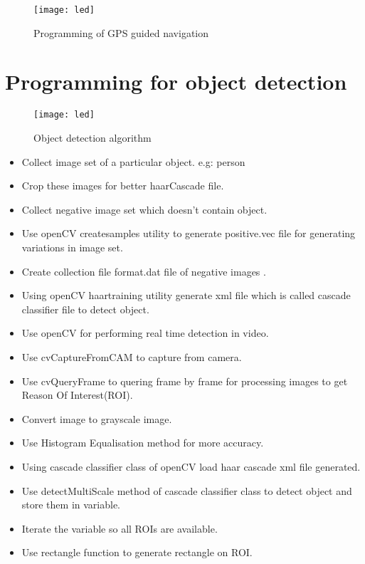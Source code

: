 \documentclass[12pt,a4paper]{report}
\begin{document}
\begin{figure}[h!]
\centering
\texttt{[image: led]}
\caption{Programming of GPS guided navigation}
\label{circuit}
\end{figure}


\newpage
\section{Programming for object detection}
\hspace*{1cm}
\begin{figure}[h!]
\centering
\texttt{[image: led]}
\caption{Object detection algorithm}
\label{circuit}
\end{figure}

\begin{itemize}
\item Collect image set of a particular object. e.g: person
\item Crop these images for better haarCascade file.
\item Collect negative image set which doesn't contain object.
\item Use openCV createsamples utility to generate positive.vec file for generating  variations in image set.
\item Create collection file format.dat file of negative images .
\item Using openCV haartraining utility generate xml file which is called cascade classifier file to detect object.
\item Use openCV  for performing real time detection in video.
\item Use cvCaptureFromCAM  to capture from camera.
\item Use cvQueryFrame to quering frame by frame for processing images to get Reason Of Interest(ROI).
\item Convert image to grayscale image.
\item Use Histogram Equalisation method for more accuracy.
\item Using  cascade classifier class of openCV load haar cascade xml file generated.
\item Use detectMultiScale method of cascade classifier class to detect object and store them in variable.
\item Iterate the variable so all ROIs are available.
\item Use rectangle function to generate rectangle on ROI.
\end{itemize}
\end{document}

